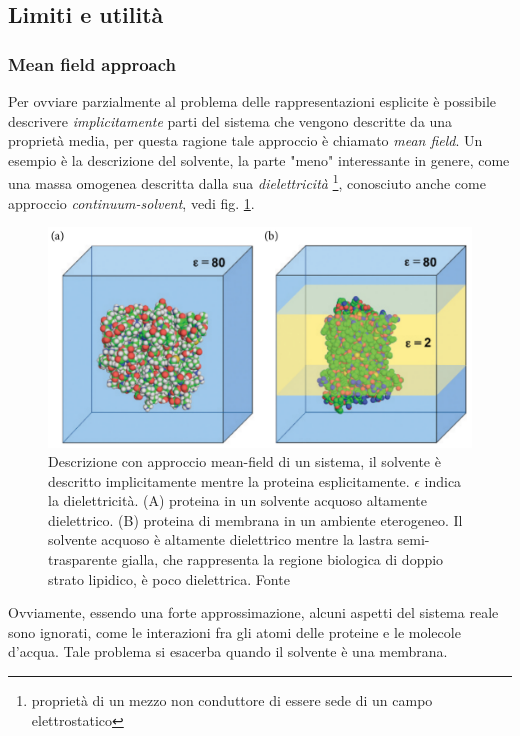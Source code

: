{\subsection{Limiti e utilità}

\subsubsection{Mean field approach}
Per ovviare parzialmente al problema delle rappresentazioni esplicite è possibile descrivere \textit{implicitamente} parti del sistema che vengono descritte da una proprietà media, per questa ragione tale approccio è chiamato \textit{mean field}. Un esempio è la descrizione del solvente, la parte "meno" interessante in genere, come una massa omogenea descritta dalla sua \textit{dielettricità} \footnote{proprietà di un mezzo non conduttore di essere sede di un campo elettrostatico}, conosciuto anche come approccio \textit{continuum-solvent}, vedi fig. \ref{fig:mean-field}.

\begin{figure}[!htb]
	\centering
	\includegraphics[scale=0.4]{images/mean-field.png}
	\caption{Descrizione con approccio mean-field di un sistema, il solvente è descritto implicitamente mentre la proteina esplicitamente. $\epsilon$ indica la dielettricità. (A) proteina in un solvente acquoso altamente dielettrico. (B) proteina di membrana in un ambiente eterogeneo. Il solvente acquoso è altamente dielettrico mentre la lastra semi-trasparente gialla, che rappresenta la regione biologica di doppio strato lipidico, è poco dielettrica. Fonte\cite{kessel_ben-tal_2018}}
	\label{fig:mean-field}
\end{figure}

Ovviamente, essendo una forte approssimazione, alcuni aspetti del sistema reale sono ignorati, come le interazioni fra gli atomi delle proteine e le molecole d'acqua. Tale problema si esacerba quando il solvente è una membrana. \\

}
